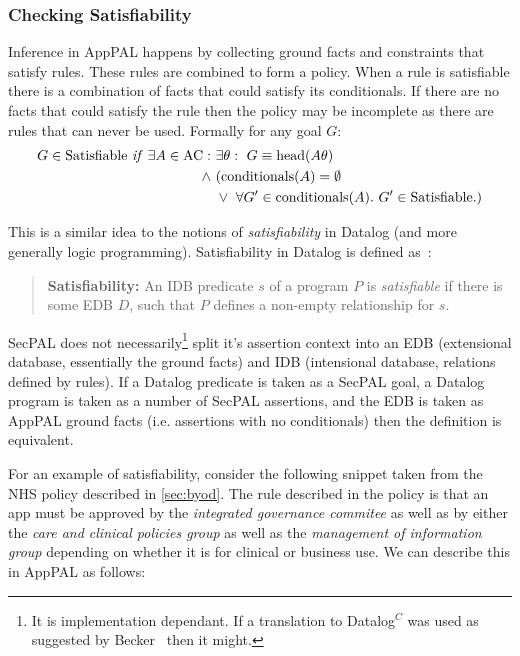 \documentclass[a4paper]{scrartcl}
\begin{document}
\subsubsection{Checking Satisfiability}

Inference in AppPAL happens by collecting ground facts and constraints that
satisfy rules. These rules are combined to form a policy. When a rule is
satisfiable there is a combination of facts that could satisfy
its conditionals. If there are no facts that could satisfy the rule then the policy may be incomplete as there are rules that can never be
used.  Formally for any goal $G$:
\begin{align*}
  G \in \text{Satisfiable}~\text{\textit{if}}~\exists A \in \text{AC}:~&\exists \theta:~G\equiv\text{head}(A\theta) \\
                                                              \wedge~ & (\text{conditionals}(A) = \emptyset \\
                                                                      & \vee~\forall G^\prime \in \text{conditionals}(A).~G^\prime \in \text{Satisfiable}.)
\end{align*}

This is a similar idea to the notions of \emph{satisfiability} in Datalog (and
more generally logic programming).  Satisfiability in Datalog is defined
as~\cite{alon_levy_equivalence_1993}:

\begin{quote}
  \textbf{Satisfiability:} An IDB predicate $s$ of a program $P$ is
  \emph{satisfiable} if there is some EDB $D$, such that $P$ defines a
  non-empty relationship for $s$.
\end{quote}

SecPAL does not necessarily\footnote{It is implementation dependant. If a
  translation to Datalog$^C$ was used as suggested by
  Becker~\cite{becker_secpal:_2010} then it might.} split it's assertion
  context into an EDB (extensional database, essentially the ground facts) and
  IDB (intensional database, relations defined by rules).  If a Datalog
  predicate is taken as a SecPAL goal, a Datalog program is taken as a number
  of SecPAL assertions, and the EDB is taken as AppPAL ground facts (i.e.
  assertions with no conditionals) then the definition is equivalent.

For an example of satisfiability, consider the following snippet taken from the
NHS policy described in \autoref{sec:byod}.  The rule described in the policy
is that an app must be approved by the \emph{integrated governance commitee} as
well as by either the \emph{care and clinical policies group} as well as the
\emph{management of information group} depending on whether it is for clinical
or business use. We can describe this in AppPAL as follows:
\end{document}
